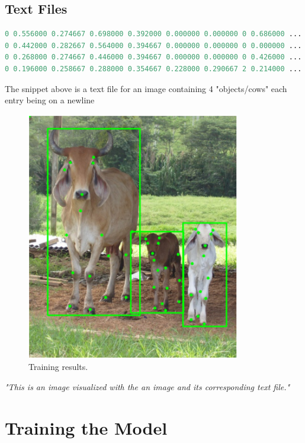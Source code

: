 \subsection{Text Files}
\begin{lstlisting}[language=Pascal, caption={Txt File Format}, label={lst:}, basicstyle=\ttfamily\scriptsize, frame=single]
0 0.556000 0.274667 0.698000 0.392000 0.000000 0.000000 0 0.686000 ..........
0 0.442000 0.282667 0.564000 0.394667 0.000000 0.000000 0 0.000000 .........
0 0.268000 0.274667 0.446000 0.394667 0.000000 0.000000 0 0.426000 .......
0 0.196000 0.258667 0.288000 0.354667 0.228000 0.290667 2 0.214000 ..........
\end{lstlisting}
The snippet above is a text file for an image containing 4 "objects/cows" each entry being on a newline
\newline
\newline
\newline
\newline
\begin{figure}[htbp]
    \centering
    \includegraphics[width=.5\textwidth]{Images/annotation.png}
    \caption{Training results.}
    \label{fig:trainresults}
\end{figure}

\textit{    "This is an image visualized with the an image and its corresponding text file."}
\newpage
\section{Training the Model}

